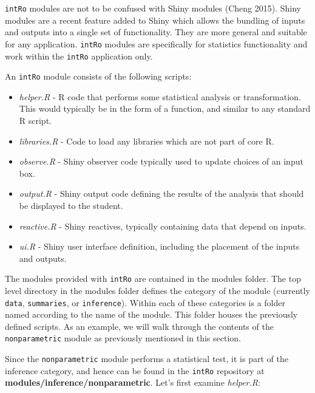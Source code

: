 \documentclass[12pt,]{article}
\providecommand{\tightlist}{%
  \setlength{\itemsep}{0pt}\setlength{\parskip}{0pt}}
\begin{document}
\texttt{intRo} modules are not to be confused with Shiny modules (Cheng
2015). Shiny modules are a recent feature added to Shiny which allows
the bundling of inputs and outputs into a single set of functionality.
They are more general and suitable for any application. \texttt{intRo}
modules are specifically for statistics functionality and work within
the \texttt{intRo} application only.

An \texttt{intRo} module consists of the following scripts:

\begin{itemize}
\tightlist
\item
  \emph{helper.R} - R code that performs some statistical analysis or
  transformation. This would typically be in the form of a function, and
  similar to any standard R script.
\item
  \emph{libraries.R} - Code to load any libraries which are not part of
  core R.
\item
  \emph{observe.R} - Shiny observer code typically used to update
  choices of an input box.
\item
  \emph{output.R} - Shiny output code defining the results of the
  analysis that should be displayed to the student.
\item
  \emph{reactive.R} - Shiny reactives, typically containing data that
  depend on inputs.
\item
  \emph{ui.R} - Shiny user interface definition, including the placement
  of the inputs and outputs.
\end{itemize}

The modules provided with \texttt{intRo} are contained in the modules
folder. The top level directory in the modules folder defines the
category of the module (currently \texttt{data}, \texttt{summaries}, or
\texttt{inference}). Within each of these categories is a folder named
according to the name of the module. This folder houses the previously
defined scripts. As an example, we will walk through the contents of the
\texttt{nonparametric} module as previously mentioned in this section.

Since the \texttt{nonparametric} module performs a statistical test, it
is part of the inference category, and hence can be found in the
\texttt{intRo} repository at \textbf{modules/inference/nonparametric}.
Let's first examine \emph{helper.R}:
\end{document}
